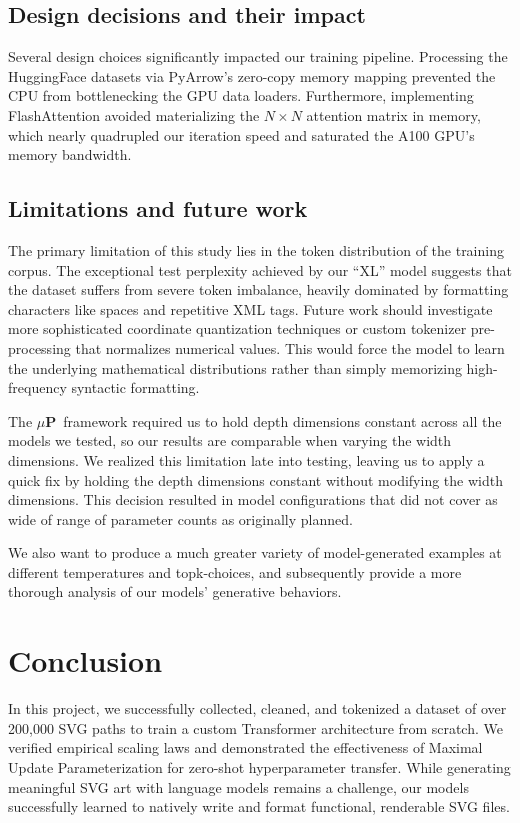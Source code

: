 \documentclass[11pt]{article}
\newcommand{\mup}{$\mu$\textbf{P}}
\begin{document}
\subsection{Design decisions and their impact}

Several design choices significantly impacted our training pipeline. Processing
the HuggingFace datasets via PyArrow's zero-copy memory mapping prevented the CPU from
bottlenecking the GPU data loaders. Furthermore, implementing FlashAttention avoided
materializing the $N \times N$ attention matrix in memory, which nearly
quadrupled our iteration speed and saturated the A100 GPU's memory bandwidth.

\subsection{Limitations and future work}


The primary limitation of this study lies in the token distribution of the training corpus. The exceptional test perplexity achieved by our ``XL''
model suggests that the dataset suffers from severe token imbalance, heavily dominated by formatting characters like spaces and repetitive XML tags.
Future work should investigate more sophisticated coordinate quantization techniques or custom tokenizer pre-processing that normalizes numerical values.
This would force the model to learn the underlying mathematical distributions rather than simply memorizing high-frequency syntactic formatting.

The \mup~framework required us to hold depth dimensions constant across all the models we tested, so our results
are comparable when varying the width dimensions. We realized this limitation late into testing, leaving us to apply
a quick fix by holding the depth dimensions constant without modifying the width dimensions. This decision resulted in model
configurations that did not cover as wide of range of parameter counts as originally planned.

We also want to produce a much greater variety
of model-generated examples at different temperatures and topk-choices, and subsequently provide a more thorough analysis of
our models' generative behaviors.


\section{Conclusion}
In this project, we successfully collected, cleaned, and tokenized a dataset of over 200,000
SVG paths to train a custom Transformer architecture from scratch. We verified empirical
scaling laws and demonstrated the effectiveness of Maximal Update Parameterization for
zero-shot hyperparameter transfer. While generating meaningful SVG art with
language models remains a challenge, our
models successfully learned to natively write and format functional, renderable SVG files.
\end{document}
